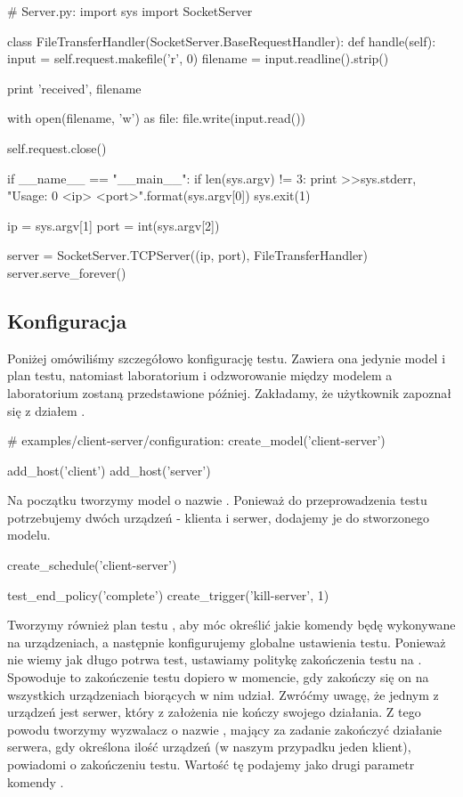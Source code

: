 \documentclass[00-praca-magisterska.tex]{subfiles}
\begin{document}
\begin{pythoncode}
  # Server.py:
  import sys
  import SocketServer

  class FileTransferHandler(SocketServer.BaseRequestHandler):
      def handle(self):
          input  = self.request.makefile('r', 0)
          filename = input.readline().strip()

          print 'received', filename

          with open(filename, 'w') as file:
	      file.write(input.read())
  
          self.request.close()

  if __name__ == "__main__":
      if len(sys.argv) != 3:
          print >>sys.stderr, "Usage: {0} <ip> <port>".format(sys.argv[0])
          sys.exit(1)

      ip = sys.argv[1]
      port = int(sys.argv[2])

      server = SocketServer.TCPServer((ip, port), FileTransferHandler)
      server.serve_forever()

\end{pythoncode}

\subsection{Konfiguracja}

Poniżej omówiliśmy szczegółowo konfigurację testu. Zawiera ona jedynie model i
plan testu, natomiast laboratorium i odzworowanie między modelem a laboratorium
zostaną przedstawione później. Zakładamy, że użytkownik zapoznał się z działem
.

\begin{pythoncode}
  # examples/client-server/configuration:
  create_model('client-server')

  add_host('client')
  add_host('server')
\end{pythoncode}

Na początku tworzymy model o nazwie . Ponieważ do
przeprowadzenia testu potrzebujemy dwóch urządzeń - klienta i serwer, dodajemy
je do stworzonego modelu. 

\begin{pythoncode}
  create_schedule('client-server')

  test_end_policy('complete')
  create_trigger('kill-server', 1)
\end{pythoncode}

Tworzymy również plan testu , aby móc określić jakie komendy
będę wykonywane na urządzeniach, a następnie konfigurujemy globalne ustawienia
testu. Ponieważ nie wiemy jak długo potrwa test, ustawiamy politykę zakończenia
testu na . Spowoduje to zakończenie testu dopiero w momencie, gdy
zakończy się on na wszystkich urządzeniach biorących w nim udział. Zwróćmy
uwagę, że jednym z urządzeń jest serwer, który z założenia nie kończy swojego
działania. Z tego powodu tworzymy wyzwalacz o nazwie , mający
za zadanie zakończyć działanie serwera, gdy określona ilość urządzeń (w naszym
przypadku jeden klient), powiadomi o zakończeniu testu. Wartość tę podajemy jako
drugi parametr komendy .
\end{document}
